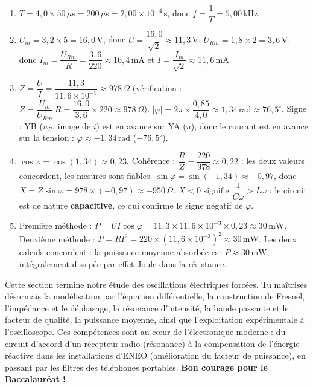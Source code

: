 \documentclass[11pt]{article}
\begin{document}
\begin{corrige}
\begin{enumerate}
    \item $T = 4{,}0 \times 50\,\mu\text{s} = 200\,\mu\text{s} = 2{,}00\times10^{-4}\,\text{s}$, donc $f = \dfrac{1}{T} = 5{,}00\,\text{kHz}$.
    \item $U_m = 3{,}2 \times 5 = 16{,}0\,\text{V}$, donc $U = \dfrac{16{,}0}{\sqrt{2}} \approx 11{,}3\,\text{V}$.
    $U_{Rm} = 1{,}8 \times 2 = 3{,}6\,\text{V}$, donc $I_m = \dfrac{U_{Rm}}{R} = \dfrac{3{,}6}{220} \approx 16{,}4\,\text{mA}$ et $I = \dfrac{I_m}{\sqrt{2}} \approx 11{,}6\,\text{mA}$.
    \item $Z = \dfrac{U}{I} = \dfrac{11{,}3}{11{,}6\times10^{-3}} \approx 978\,\Omega$ (vérification : $Z = \dfrac{U_m}{U_{Rm}}\,R = \dfrac{16{,}0}{3{,}6}\times 220 \approx 978\,\Omega$).
    $|\varphi| = 2\pi \times \dfrac{0{,}85}{4{,}0} \approx 1{,}34\,\text{rad} \approx 76{,}5^\circ$.
    Signe : YB ($u_R$, image de $i$) est en avance sur YA ($u$), donc le courant est en avance sur la tension : $\varphi \approx -1{,}34\,\text{rad}$ ($-76{,}5^\circ$).
    \item $\cos\varphi = \cos(1{,}34) \approx 0{,}23$. Cohérence : $\dfrac{R}{Z} = \dfrac{220}{978} \approx 0{,}22$ : les deux valeurs concordent, les mesures sont fiables.
    $\sin\varphi = \sin(-1{,}34) \approx -0{,}97$, donc $X = Z\sin\varphi = 978 \times (-0{,}97) \approx -950\,\Omega$.
    $X < 0$ signifie $\dfrac{1}{C\omega} > L\omega$ : le circuit est de nature \textbf{capacitive}, ce qui confirme le signe négatif de $\varphi$.
    \item Première méthode : $P = U I \cos\varphi = 11{,}3 \times 11{,}6\times10^{-3} \times 0{,}23 \approx 30\,\text{mW}$.
    Deuxième méthode : $P = R I^2 = 220 \times (11{,}6\times10^{-3})^2 \approx 30\,\text{mW}$.
    Les deux calculs concordent : la puissance moyenne absorbée est $P \approx 30\,\text{mW}$, intégralement dissipée par effet Joule dans la résistance.
\end{enumerate}
\end{corrige}

Cette section termine notre étude des oscillations électriques forcées. Tu maîtrises désormais la modélisation par l'équation différentielle, la construction de Fresnel, l'impédance et le déphasage, la résonance d'intensité, la bande passante et le facteur de qualité, la puissance moyenne, ainsi que l'exploitation expérimentale à l'oscilloscope. Ces compétences sont au cœur de l'électronique moderne : du circuit d'accord d'un récepteur radio (résonance) à la compensation de l'énergie réactive dans les installations d'ENEO (amélioration du facteur de puissance), en passant par les filtres des téléphones portables. \textbf{Bon courage pour le Baccalauréat !}
\end{document}
